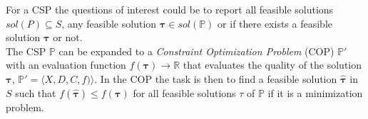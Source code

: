 For a CSP the questions of interest could be to report all feasible solutions $sol(P) \subseteq S $, any feasible 
solution $\mathbf{\tau}\in sol(\mathbb{P})$ or if there exists a feasible solution $\mathbf{\tau}$ or not. \\
The CSP $\mathbb{P}$ can be expanded to a \emph{Constraint Optimization Problem} (COP) $\mathbb{P'}$ 
with an evaluation function $f(\mathbf{\tau}) \rightarrow \mathbb{R}$ that evaluates the quality of the solution 
$\mathbf{\tau}$, $\mathbb{P'} = \langle X,D,C,f) \rangle$.  In the COP the task is then to find a feasible solution 
$\hat{\mathbf{\tau}}$ in $S$ such that $f(\hat{\mathbf{\tau}}) \leq f(\mathbf{\tau})$ for all feasible solutions $\tau$ 
of $\mathbb{P}$ if it is a minimization problem. \\

